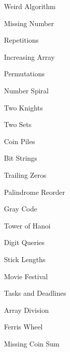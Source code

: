 \begin{practice}
\begin{pplist}
  \item Weird Algorithm
  \item Missing Number
  \item Repetitions
  \item Increasing Array
  \item Permutations
  \item Number Spiral
  \item Two Knights
  \item Two Sets
  \item Coin Piles
\end{pplist}
\begin{pplist}
  \item Bit Strings
  \item Trailing Zeros
  \item Palindrome Reorder
  \item Gray Code
  \item Tower of Hanoi
  \item Digit Queries
\end{pplist}
\begin{pplist}
  \item Stick Lengths
  \item Movie Festival
  \item Tasks and Deadlines
  \item Array Division
  \item Ferris Wheel
  \item Missing Coin Sum
\end{pplist}
\end{practice}
